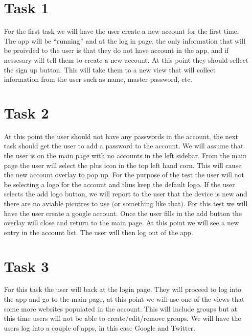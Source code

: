 \documentclass[a4paper,12pt]{article}
\begin{document}
\section*{Task 1}

For the first task we will have the user create a new account for the first time. The app will be ``running'' and
at the log in page, the only information that will be proivded to the user is that they do not have account in the
app, and if nessesary will tell them to create a new account. At this point they should sellect the sign up button.
This will take them to a new view that will collect information from the user such as name, master password, etc.


\section*{Task 2}
At this point the user should not have any passwords in the account, the next task should get the user to add
a password to the account. We will assume that the user is on the main page with no accounts in the left
sidebar. From the main page the user will select the plus icon in the top left hand corn. This will cause
the new account overlay to pop up. For the purpose of the test the user will not be selecting a logo for
the account and thus keep the default logo. If the user selects the add logo button, we will report to
the user that the device is new and there are no aviable picutres to use $($or something like that$)$.
For this test we will have the user create a google account. Once the user fills in the add button
the overlay will close and return to the main page. At this point we will see a new entry in the
account list. The user will then log out of the app.

\section*{Task 3}

For this task the user will back at the login page. They will proceed to log into the app and go to the 
main page, at this point we will use one of the views that some more websites populated in the account.
This will include groups but at this time users will not be able to create/edit/remove groups. We will
have the users log into a couple of apps, in this case Google and Twitter. 
\end{document}

